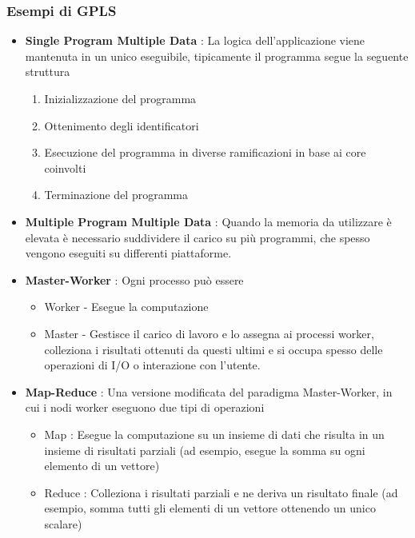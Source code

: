 \documentclass[10pt, letterpaper]{report}
\begin{document}
\subsubsection{Esempi di GPLS}\begin{itemize}
    \item \textbf{Single Program Multiple Data} : La logica dell'applicazione viene mantenuta in un unico 
    eseguibile, tipicamente il programma segue la seguente struttura\begin{enumerate}
        \item Inizializzazione del programma 
        \item Ottenimento degli identificatori 
        \item Esecuzione del programma in diverse ramificazioni in base ai core coinvolti 
        \item Terminazione del programma
    \end{enumerate}
    \item \textbf{Multiple Program Multiple Data} : Quando la memoria da utilizzare è elevata è necessario suddividere 
    il carico su più programmi, che spesso vengono eseguiti su differenti piattaforme.
    \item \textbf{Master-Worker} : Ogni processo può essere \begin{itemize}
    \item Worker - Esegue la computazione
        \item Master - Gestisce il carico di lavoro e lo assegna ai processi worker, colleziona i risultati ottenuti 
        da questi ultimi e si occupa spesso delle operazioni di I/O o interazione con l'utente.
    \end{itemize}
    \item \textbf{Map-Reduce} : Una versione modificata del paradigma Master-Worker, in cui i nodi 
    worker eseguono due tipi di operazioni \begin{itemize}
        \item Map : Esegue la computazione su un insieme di dati che risulta in un insieme di risultati parziali (ad esempio, 
        esegue la somma su ogni elemento di un vettore) 
        \item Reduce : Colleziona i risultati parziali e ne deriva un risultato finale (ad esempio, somma tutti gli elementi di un 
        vettore ottenendo un unico scalare)
    \end{itemize}
\end{itemize}
\end{document}
